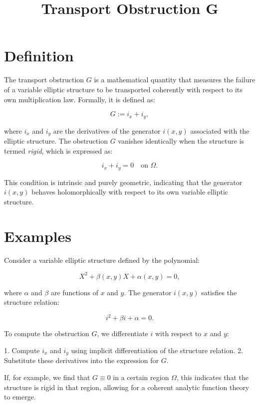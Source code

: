 \documentclass[11pt,a4paper]{article}
\title{Transport Obstruction G}
\date{}
\begin{document}
\maketitle
\section{Definition}
The transport obstruction \( G \) is a mathematical quantity that measures the failure of a variable elliptic structure to be transported coherently with respect to its own multiplication law. Formally, it is defined as:

\begin{equation}
G := i_x + i_y,
\end{equation}

where \( i_x \) and \( i_y \) are the derivatives of the generator \( i(x, y) \) associated with the elliptic structure. The obstruction \( G \) vanishes identically when the structure is termed \textit{rigid}, which is expressed as:

\begin{equation}
i_x + i_y = 0 \quad \text{on } \Omega.
\end{equation}

This condition is intrinsic and purely geometric, indicating that the generator \( i(x, y) \) behaves holomorphically with respect to its own variable elliptic structure.

\section{Examples}
Consider a variable elliptic structure defined by the polynomial:

\[
X^2 + \beta(x, y) X + \alpha(x, y) = 0,
\]

where \( \alpha \) and \( \beta \) are functions of \( x \) and \( y \). The generator \( i(x, y) \) satisfies the structure relation:

\[
i^2 + \beta i + \alpha = 0.
\]

To compute the obstruction \( G \), we differentiate \( i \) with respect to \( x \) and \( y \):

1. Compute \( i_x \) and \( i_y \) using implicit differentiation of the structure relation.
2. Substitute these derivatives into the expression for \( G \).

If, for example, we find that \( G \equiv 0 \) in a certain region \( \Omega \), this indicates that the structure is rigid in that region, allowing for a coherent analytic function theory to emerge.
\end{document}
